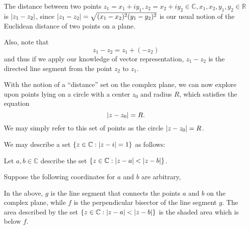 \documentclass[notoc,notitlepage]{tufte-book}
\begin{document}
The distance between two points $z_1 = x_1 + iy_1, z_2 = x_2 + iy_2 \in \mathbb{C}, x_1, x_2, y_1, y_2 \in \mathbb{R}$ is $\left|z_1 - z_2\right|$, since $\left|z_1 - z_2\right| = \sqrt{(x_1 - x_2)^2 (y_1 - y_2)^2}$ is our usual notion of the Euclidean distance of two points on a plane.

Also, note that
\begin{equation*}
	z_1 - z_2 = z_1 + (-z_2)
\end{equation*}
and thus if we apply our knowledge of vector representation, $z_1 - z_2$ is the directed line segment from the point $z_2$ to $z_1$.

With the notion of a ``distance'' set on the complex plane, we can now explore upon points lying on a circle with a center $z_0$ and radius $R$, which satisfies the equation
\begin{equation*}
	\left|z - z_0\right| = R.
\end{equation*}
We may simply refer to this set of points as the circle $\left|z - z_0\right| = R$.

\begin{eg}
	We may describe a set $\left\{z \in \mathbb{C} : \left|z -i\right| = 1 \right\}$ as follows:

	\begin{center}
	\end{center}

	Let $a, b \in \mathbb{C}$ describe the set $\left\{z \in \mathbb{C} : \left|z - a\right| < \left|z - b\right| \right\}$.

	Suppose the following coordinates for $a$ and $b$ are arbitrary,

	\begin{center}
	\end{center}

	In the above, $g$ is the line segment that connects the points $a$ and $b$ on the complex plane, while $f$ is the perpendicular bisector of the line segment $g$. The area described by the set $\left\{z \in \mathbb{C} : \left|z - a\right| < \left|z - b\right| \right\}$ is the shaded area which is below $f$.
\end{eg}
\end{document}
